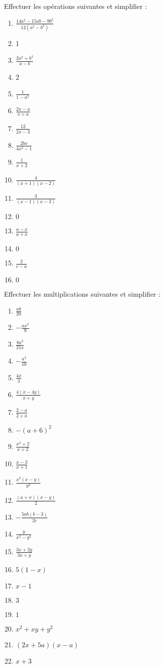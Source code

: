 \begin{solution}
Effectuer les opérations suivantes et simplifier :
\begin{multicols}{2}
\begin{enumerate}
\item $\frac{14{{a}^{2}}-15ab-9{{b}^{2}}}{12({{a}^{2}}-{{b}^{2}})}$
\item 1
\item $\frac{2{{a}^{2}}+{{b}^{2}}}{a-b}$
\item 2
\item $\frac{1}{1-{{a}^{2}}}$
\item $\frac{2x-a}{x+a}$
\item $\frac{12}{2x-3}$
\item $\frac{2bx}{4{{x}^{2}}-1}$
\item $\frac{1}{x+2}$
\item $\frac{4}{(x+1)(x-2)}$
\item $\frac{3}{(x-1)(x-3)}$
\item $0$
\item $\frac{a-x}{a+x}$
\item $0$
\item $\frac{2}{c-a}$
\item $0$
\end{enumerate}
\end{multicols}
\end{solution}

\begin{solution}
Effectuer les multiplications suivantes et simplifier :
\begin{multicols}{3}
\begin{enumerate}
\item $\frac{ab}{20}$
\item $-\frac{a{{x}^{2}}}{9}$
\item $\frac{8{{a}^{2}}}{21x}$
\item $-\frac{{{a}^{3}}}{10}$
\item $\frac{4x}{3}$
\item $\frac{4(x-4y)}{x+y}$
\item $\frac{2-a}{2+a}$
\item $-{{(a+6)}^{2}}$
\item $\frac{{{x}^{2}}+2}{x+2}$
\item $\frac{x-3}{x+1}$
\item $\frac{{{x}^{2}}(x-y)}{{{y}^{2}}}$
\item $\frac{(a+x)(x-y)}{2}$
\item $-\frac{5ab(b-3)}{2c}$
\item $\frac{y}{{{x}^{2}}-{{y}^{2}}}$
\item $\frac{3x+2y}{3x+y}$
\item $5\left( 1-x \right)$
\item $x-1$
\item $3$
\item $1$
\item ${{x}^{2}}+xy+{{y}^{2}}$
\item $(2x+5a)(x-a)$
\item $x+3$
\end{enumerate}
\end{multicols}
\end{solution}

